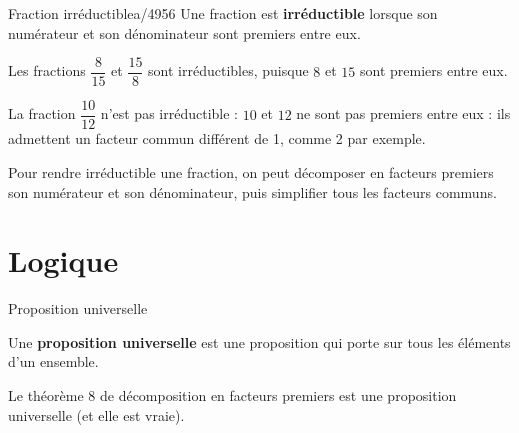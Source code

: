 \begin{pageCours}
\begin{minipage}{0.5\linewidth}
  \begin{DefTQ}{Fraction irréductible}{a/4956}
    Une fraction est \textbf{irréductible} lorsque son numérateur
    et son dénominateur sont premiers entre eux.
  \end{DefTQ}
\end{minipage}
\begin{minipage}{0.5\linewidth}
\begin{Ex}
  Les fractions $\dfrac{8}{15}$ et $\dfrac{15}8$ sont irréductibles, puisque
  $8$ et $15$ sont premiers entre eux.

  La fraction $\dfrac{10}{12}$ n'est pas irréductible : $10$ et $12$ ne sont
  pas premiers entre eux : ils admettent un facteur commun différent de 1, comme 2 par exemple.
\end{Ex}
\begin{Mt}
  Pour rendre irréductible une fraction, on peut décomposer en facteurs premiers
  son numérateur et son dénominateur, puis simplifier tous les facteurs
  communs.
\end{Mt}
\end{minipage}




\section{Logique}

\begin{minipage}{0.5\linewidth}
\begin{DefTQ}{Proposition universelle}{}

  Une \textbf{proposition universelle} est une proposition qui porte sur tous
  les éléments d'un ensemble. 

\end{DefTQ}
\end{minipage}
\begin{minipage}{0.5\linewidth}
\begin{Ex} 
  Le théorème %
  8 de décomposition en facteurs premiers est une proposition
  universelle (et elle est vraie).
  

\end{Ex}
\end{minipage}


\end{pageCours}

